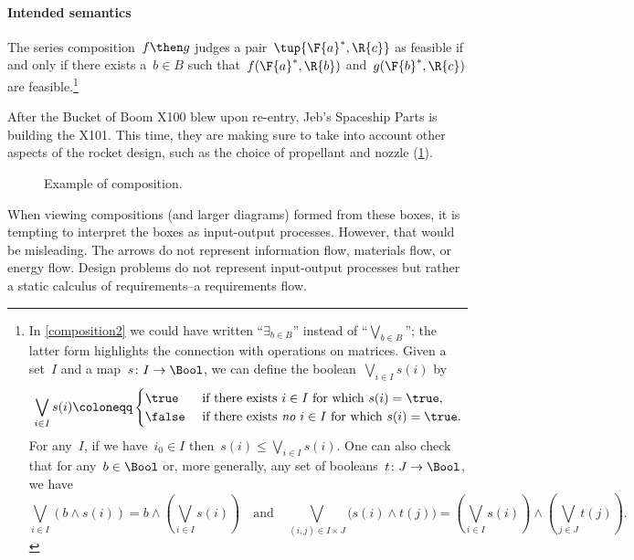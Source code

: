 \paragraph{Intended semantics}
The series composition~$f\then g$ judges a pair~$\tup{\F{a}^*,\R{c}}$ as feasible if and only if there exists a~$b \in B$ such that~$f(\F{a}^*,\R{b})$ and~$g(\F{b}^*,\R{c})$ are feasible.\footnote{In \eqref{composition2} we could have written ``$\exists_{b\in B}$''
instead of ``$\bigvee_{b\in B}$''; the latter form highlights the connection
with operations on matrices. Given a set~$I$ and a map~$s\colon I\to\Bool$, we can define the boolean~$\bigvee_{i\in I}s(i)$ by
\begin{equation*}
 \bigvee_{i\in I}s(i)\coloneqq
 \begin{cases}
 	\true&\text{ if there exists }i\in I\text{ for which }s(i)=\true,\\
 	\false&\text{ if there exists \emph{no} }i\in I\text{ for which }s(i)=\true.
 \end{cases}
 \end{equation*}
 For any~$I$, if we have~$i_0\in I$ then~$s(i)\leq\bigvee_{i\in I}s(i)$. One can also check that for any~$b\in\Bool$ or, more generally, any set of booleans~$t\colon J\to\Bool$, we have
 \begin{equation*}
     \bigvee_{i\in I}(b\wedge s(i))=b\wedge\left(\bigvee_{i\in I}s(i)\right)
 \quad\text{and}\quad
 \bigvee_{(i,j)\in I\times  J}\big(s(i)\wedge t(j)\big)=\left(\bigvee_{i\in I}s(i)\right)\wedge\left(\bigvee_{j\in J} t(j)\right).
 \end{equation*}
}

\begin{example}
After the Bucket of Boom X100 blew upon re-entry, Jeb's Spaceship Parts is building the X101. This time, they are making sure to take into account other aspects of the rocket design, such as the choice of propellant and nozzle (\cref{fig:examplecomposition}).
\begin{figure}[h!]
\begin{center}
\end{center}
\caption{Example of composition. \label{fig:examplecomposition}}
\end{figure}
\end{example}

\begin{remark}
When viewing compositions (and larger diagrams) formed from these boxes, it is tempting to interpret the boxes as input-output processes. However, that would be misleading. The arrows do not represent information flow, materials flow, or energy flow. Design problems do not represent input-output processes but rather a static calculus of requirements--a requirements flow.
\end{remark}

